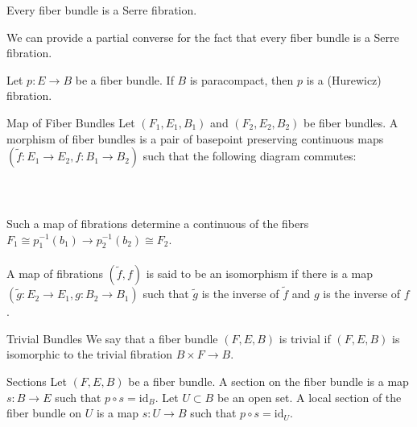 \documentclass[a4paper]{article}
\begin{document}
\begin{prp}{}{} Every fiber bundle is a Serre fibration. 
\end{prp}

We can provide a partial converse for the fact that every fiber bundle is a Serre fibration. 

\begin{prp}{}{} Let $p:E\to B$ be a fiber bundle. If $B$ is paracompact, then $p$ is a (Hurewicz) fibration. 
\end{prp}

\begin{defn}{Map of Fiber Bundles}{} Let $(F_1,E_1,B_1)$ and $(F_2,E_2,B_2)$ be fiber bundles. A morphism of fiber bundles is a pair of basepoint preserving continuous maps $(\tilde{f}:E_1\to E_2,f:B_1\to B_2)$ such that the following diagram commutes: \\~\\
\\~\\
Such a map of fibrations determine a continuous of the fibers $F_1\cong p_1^{-1}(b_1)\to p_2^{-1}(b_2)\cong F_2$. \\~\\

A map of fibrations $(\tilde{f},f)$ is said to be an isomorphism if there is a map $(\tilde{g}:E_2\to E_1,g:B_2\to B_1)$ such that $\tilde{g}$ is the inverse of $\tilde{f}$ and $g$ is the inverse of $f$. 
\end{defn}

\begin{defn}{Trivial Bundles}{} We say that a fiber bundle $(F,E,B)$ is trivial if $(F,E,B)$ is isomorphic to the trivial fibration $B\times F\to B$. 
\end{defn}

\begin{defn}{Sections}{} Let $(F,E,B)$ be a fiber bundle. A section on the fiber bundle is a map $s:B\to E$ such that $p\circ s=\text{id}_B$. Let $U\subset B$ be an open set. A local section of the fiber bundle on $U$ is a map $s:U\to B$ such that $p\circ s=\text{id}_U$. 
\end{defn}
\end{document}
